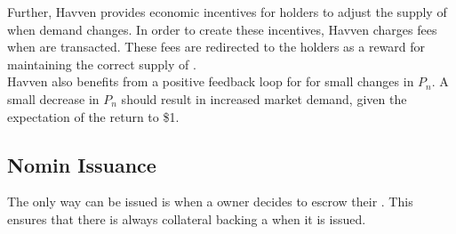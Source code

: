 \noindent Further, Havven provides economic incentives for \HAV{} holders to adjust the supply of \NOM{} when demand changes. In order to create these incentives, Havven charges fees when \NOM{} are transacted. These fees are redirected to the \HAV{} holders as a reward for maintaining the correct supply of \NOM{} . \\

\noindent Havven also benefits from a positive feedback loop for for small changes in $P_n$. A small decrease in $P_n$ should result in increased market demand, given the expectation of the return to \$1. 

\newpage

\subsection{Nomin Issuance} The only way \NOM{} can be issued is when a \HAV{} owner decides to escrow their \HAV{}. This ensures that there is always collateral backing a \NOM{} when it is issued. \\

